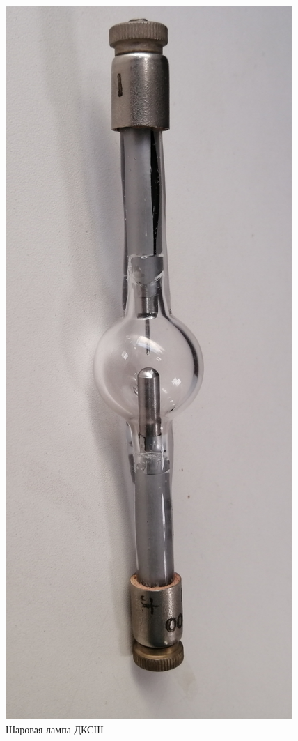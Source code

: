 \documentclass{beamer}
\begin{document}
\begin{frame}
\begin{columns}
\begin{figure}
				\includegraphics[width=\linewidth]{res/lamp_spherical_xe.png}
				\caption*{Шаровая лампа ДКСШ}
			\end{figure}
		\end{columns}
	\end{frame}	
\end{document}
